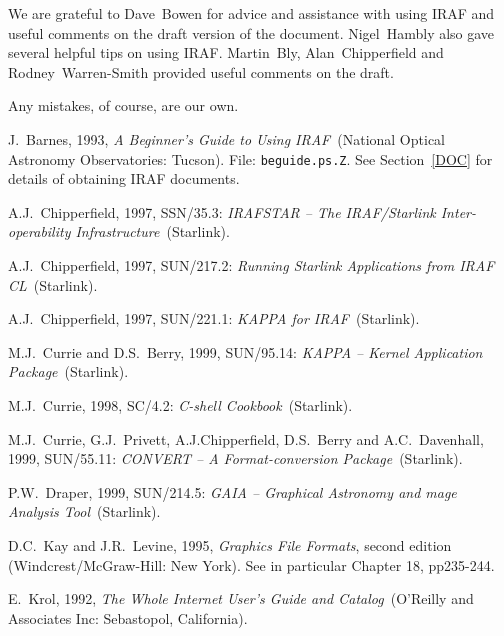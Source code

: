 \documentclass[twoside,11pt]{article}
\newcommand{\xref}[3]{#1}
\begin{document}
We are grateful to Dave~Bowen for advice and assistance with using
IRAF and useful comments on the draft version of the document.
Nigel~Hambly also gave several helpful tips on using IRAF.  Martin~Bly,
Alan~Chipperfield and Rodney~Warren-Smith provided useful comments on the
draft.

Any mistakes, of course, are our own.


% 

\newpage
{}
\begin{thebibliography}{99}

   J.~Barnes, 1993, {\it A Beginner's Guide to
   Using IRAF}\, (National Optical Astronomy Observatories: Tucson).
   File: {\tt beguide.ps.Z}.  See Section~\ref{DOC} for details of
   obtaining IRAF documents.

   A.J.~Chipperfield, 1997, \xref{SSN/35.3}{ssn35}{}:
   {\it IRAFSTAR -- The IRAF/Starlink Inter-operability Infrastructure}\,
   (Starlink).

   A.J.~Chipperfield, 1997, \xref{SUN/217.2}{sun217}{}:
   {\it Running Starlink Applications from IRAF CL}\, (Starlink).

   A.J.~Chipperfield, 1997, \xref{SUN/221.1}{sun221}{}:
   {\it KAPPA for IRAF}\, (Starlink).

   M.J.~Currie and D.S.~Berry, 1999,
   \xref{SUN/95.14}{sun95}{}: {\it KAPPA -- Kernel Application Package}\,
   (Starlink).

   M.J.~Currie, 1998, \xref{SC/4.2}{sc4}{}:
   {\it C-shell Cookbook}\, (Starlink).

   M.J.~Currie, G.J.~Privett, A.J.Chipperfield,
   D.S.~Berry and A.C.~Davenhall, 1999, \xref{SUN/55.11}{sun55}{}:
   {\it CONVERT -- A Format-conversion Package}\, (Starlink).

   P.W.~Draper, 1999, \xref{SUN/214.5}{sun214}{}:
   {\it GAIA -- Graphical Astronomy and mage Analysis Tool}\, (Starlink).

   D.C.~Kay and J.R.~Levine, 1995, {\it Graphics File
   Formats}, second edition
  \newline (Windcrest/McGraw-Hill: New York).  See in particular
   Chapter 18, pp235-244.

   E.~Krol, 1992, {\it The Whole Internet User's Guide
   and Catalog}\, (O'Reilly and Associates Inc: Sebastopol, California).


\end{thebibliography}
\end{document}
